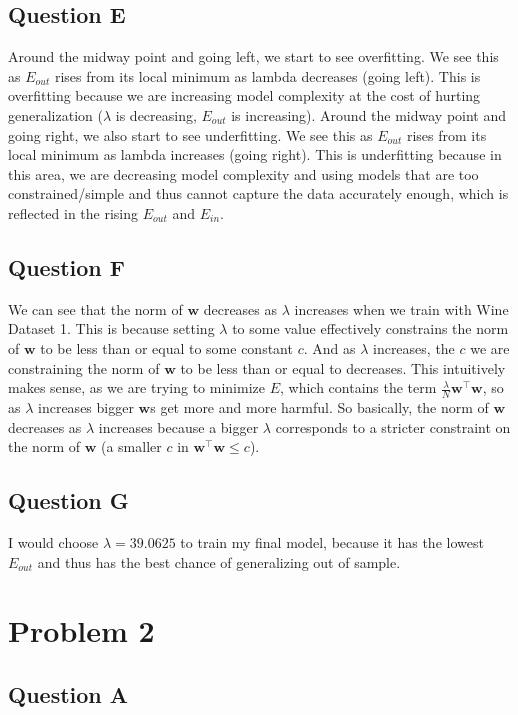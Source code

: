 \documentclass{article}
\newcommand*{\wb}{\ensuremath{\mathbf{w}}}
\begin{document}
\subsection*{Question E}
Around the midway point and going left, we start to see overfitting. We see
this as $E_{out}$
rises from its local minimum as lambda decreases (going left). This is overfitting
because we are increasing model complexity at the cost of hurting generalization
($\lambda$ is decreasing, $E_{out}$ is increasing).
Around the midway point and going right, we also start to see underfitting. We see
this as $E_{out}$ rises from its local minimum as lambda increases (going right).
This is underfitting because in this area, we are decreasing model complexity
and using models that are too constrained/simple and thus
cannot capture the data accurately enough, which is reflected in the
rising $E_{out}$ and $E_{in}$.

\subsection*{Question F}
We can see that the norm of $\wb$ decreases as $\lambda$ increases when we train
with Wine Dataset 1. This is because setting $\lambda$ to some value effectively
constrains the norm of $\wb$ to be less than or equal to some constant $c$. And
as $\lambda$ increases, the $c$ we are constraining the norm of $\wb$ to be
less than or equal to decreases. This intuitively makes sense, as we are trying
to minimize $E$, which contains the term $\frac{\lambda}{N}\wb^{\intercal}\wb$,
so as $\lambda$ increases bigger $\wb$s get more and more harmful. So basically,
the norm of $\wb$ decreases as $\lambda$ increases because a bigger $\lambda$
corresponds to a stricter constraint on the norm of $\wb$
(a smaller $c$ in $\wb^{\intercal}\wb \leq c$).

\subsection*{Question G}
I would choose $\lambda = 39.0625$  to train my final model, because it has
the lowest $E_{out}$ and thus has the best chance of generalizing out of sample.

\newpage
\section*{Problem 2}
\subsection*{Question A}
\end{document}
